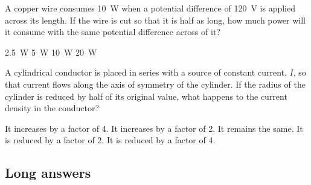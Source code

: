 \question A copper wire consumes \SI{10}{W} when a potential difference of \SI{120}{V} is applied across its length. If the wire is cut so that it is half as long, how much power will it consume with the same potential difference across of it?
\begin{checkboxes}
\choice \SI{2.5}{W}
\choice \SI{5}{W}
\choice \SI{10}{W}
\CorrectChoice \SI{20}{W} \correct
\end{checkboxes}

\question A cylindrical conductor is placed in series with a source of constant current, $I$, so that current flows along the axis of symmetry of the cylinder. If the radius of the cylinder is reduced by half of its original value, what happens to the current density in the conductor?
\begin{checkboxes}
\CorrectChoice It increases by a factor of 4. \correct
\choice It increases by a factor of 2.
\choice It remains the same.
\choice It is reduced by a factor of 2.
\choice It is reduced by a factor of 4.
\end{checkboxes}
%
%
\subsection{Long answers}


